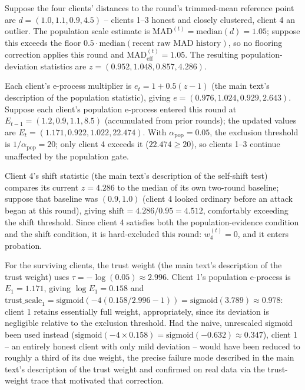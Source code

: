\documentclass[a4paper,11pt]{article}
\begin{document}
Suppose the four clients' distances to the round's trimmed-mean reference point are $d = (1.0, 1.1, 0.9, 4.5)$ -- clients 1--3 honest and closely clustered, client 4 an outlier. The population scale estimate is $\mathrm{MAD}^{(t)} = \mathrm{median}(d) = 1.05$; suppose this exceeds the floor $0.5 \cdot \mathrm{median}(\text{recent raw MAD history})$, so no flooring correction applies this round and $\mathrm{MAD}^{(t)}_{\mathrm{eff}} = 1.05$. The resulting population-deviation statistics are $z = (0.952, 1.048, 0.857, 4.286)$.

Each client's e-process multiplier is $e_t = 1 + 0.5(z-1)$ (the main text's description of the population statistic), giving $e = (0.976, 1.024, 0.929, 2.643)$. Suppose each client's population e-process entered this round at $E_{t-1} = (1.2, 0.9, 1.1, 8.5)$ (accumulated from prior rounds); the updated values are $E_t = (1.171, 0.922, 1.022, 22.474)$. With $\alpha_{\mathrm{pop}} = 0.05$, the exclusion threshold is $1/\alpha_{\mathrm{pop}} = 20$; only client 4 exceeds it ($22.474 \ge 20$), so clients 1--3 continue unaffected by the population gate.

Client 4's shift statistic (the main text's description of the self-shift test) compares its current $z=4.286$ to the median of its own two-round baseline; suppose that baseline was $(0.9, 1.0)$ (client 4 looked ordinary before an attack began at this round), giving $\mathrm{shift} = 4.286 / 0.95 = 4.512$, comfortably exceeding the shift threshold. Since client 4 satisfies both the population-evidence condition and the shift condition, it is hard-excluded this round: $w_4^{(t)} = 0$, and it enters probation.

For the surviving clients, the trust weight (the main text's description of the trust weight) uses $\tau = -\log(0.05) \approx 2.996$. Client 1's population e-process is $E_{1} = 1.171$, giving $\log E_1 = 0.158$ and $\mathrm{trust\_scale}_1 = \mathrm{sigmoid}(-4(0.158/2.996 - 1)) = \mathrm{sigmoid}(3.789) \approx 0.978$: client 1 retains essentially full weight, appropriately, since its deviation is negligible relative to the exclusion threshold. Had the naive, unrescaled sigmoid been used instead ($\mathrm{sigmoid}(-4 \times 0.158) = \mathrm{sigmoid}(-0.632) \approx 0.347$), client 1 -- an entirely honest client with only mild deviation -- would have been reduced to roughly a third of its due weight, the precise failure mode described in the main text's description of the trust weight and confirmed on real data via the trust-weight trace that motivated that correction.
\end{document}
